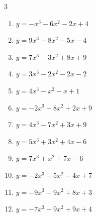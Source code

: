 \begin{multicols}{3}
\begin{enumerate}
  \item $y=-x^{3}-6x^{2}-2x+4$


  \item $y=9x^{3}-8x^{2}-5x-4$


  \item $y=7x^{3}-3x^{2}+8x+9$


  \item $y=3x^{3}-2x^{2}-2x-2$


  \item $y=4x^{3}-x^{2}-x+1$


  \item $y=-2x^{3}-8x^{2}+2x+9$


  \item $y=4x^{3}-7x^{2}+3x+9$


\columnbreak %

  \item $y=5x^{3}+3x^{2}+4x-6$


  \item $y=7x^{3}+x^{2}+7x-6$


  \item $y=-2x^{3}-5x^{2}-4x+7$


  \item $y=-9x^{3}-9x^{2}+8x+3$


  \item $y=-7x^{3}-9x^{2}+9x+4$



\end{enumerate}
\end{multicols}
